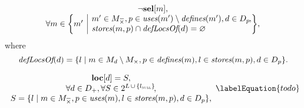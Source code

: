 \begin{equation}
  \begin{array}{c}
    \neg\mVar{sel}[m], \\
    \forall m \in
      \mSetBuilder*{m'}%
                   {%
                     \begin{array}{@{}l@{}}
                       m' \in \mKillMatchCompSet,
                       p \in \mUses(m') \setminus \mDefines(m'),
                       d \in \mDataSet[p] \hspace{-1pt}, \\
                       \mStores(m, p) \cap \mDefLocsOf(d) = \mEmptySet
                     \end{array}
                   } \!,
  \end{array}
\end{equation}
%
where
%
\begin{equation}
  \mDefLocsOf(d)
  =
  \mSetBuilder{l}%
              {%
                m \in \mMatchSet[d] \setminus \mKillMatchSet,
                p \in \mDefines(m),
                l \in \mStores(m, p),
                d \in \mDataSet[p]
              }.
\end{equation}



\begin{equation}
  \begin{array}{c}
    \mVar{loc}[d] = S, \\
    \forall d \in \mDataUsedOnceSet,
    \forall S \in
      \mPowerset{\mLocationSet \, \cup \, \mSet{\mNullLocation}} \!, \\
    S = \mSetBuilder{l}%
                    {%
                      m \in \mKillMatchCompSet,
                      p \in \mUses(m),
                      l \in \mStores(m, p),
                      d \in \mDataSet[p]
                    },
  \end{array}
  \labelEquation{todo}
\end{equation}



